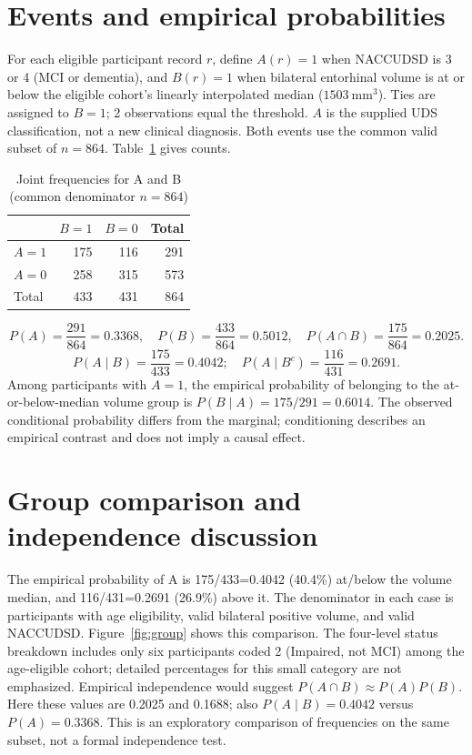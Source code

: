 \documentclass[11pt]{article}
\begin{document}
\section{Events and empirical probabilities}
For each eligible participant record $r$, define $A(r)=1$ when NACCUDSD is 3 or 4 (MCI or dementia), and $B(r)=1$ when bilateral entorhinal volume is at or below the eligible cohort's linearly interpolated median ($1503\ \mathrm{mm}^3$). Ties are assigned to $B=1$; 2 observations equal the threshold. $A$ is the supplied UDS classification, not a new clinical diagnosis. Both events use the common valid subset of $n=864$. Table~\ref{tab:2x2} gives counts.

\begin{table}[H]\centering\caption{Joint frequencies for A and B (common denominator $n=864$)}\label{tab:2x2}\begin{tabular}{lrrr}\toprule & $B=1$ & $B=0$ & Total\\\midrule $A=1$ & 175 & 116 & 291\\ $A=0$ & 258 & 315 & 573\\ Total & 433 & 431 & 864\\\bottomrule\end{tabular}\end{table}
\[P(A)=\frac{291}{864}=0.3368,\quad P(B)=\frac{433}{864}=0.5012,\quad P(A\cap B)=\frac{175}{864}=0.2025.\]
\[P(A\mid B)=\frac{175}{433}=0.4042;\quad P(A\mid B^c)=\frac{116}{431}=0.2691.\]
Among participants with $A=1$, the empirical probability of belonging to the at-or-below-median volume group is $P(B\mid A)=175/291=0.6014$. The observed conditional probability differs from the marginal; conditioning describes an empirical contrast and does not imply a causal effect.
\section{Group comparison and independence discussion}
The empirical probability of A is 175/433=0.4042 (40.4\%) at/below the volume median, and 116/431=0.2691 (26.9\%) above it. The denominator in each case is participants with age eligibility, valid bilateral positive volume, and valid NACCUDSD. Figure~\ref{fig:group} shows this comparison. The four-level status breakdown includes only six participants coded 2 (Impaired, not MCI) among the age-eligible cohort; detailed percentages for this small category are not emphasized.
Empirical independence would suggest $P(A\cap B)\approx P(A)P(B)$. Here these values are 0.2025 and 0.1688; also $P(A\mid B)=0.4042$ versus $P(A)=0.3368$. This is an exploratory comparison of frequencies on the same subset, not a formal independence test.
\end{document}
